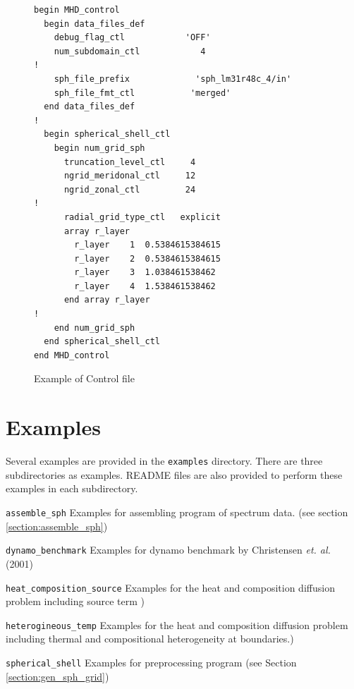 \begin{figure}[htbp]
\begin{center}
%
\begin{verbatim}
begin MHD_control
  begin data_files_def
    debug_flag_ctl            'OFF'
    num_subdomain_ctl            4
!
    sph_file_prefix             'sph_lm31r48c_4/in'
    sph_file_fmt_ctl           'merged'
  end data_files_def
!
  begin spherical_shell_ctl
    begin num_grid_sph
      truncation_level_ctl     4
      ngrid_meridonal_ctl     12
      ngrid_zonal_ctl         24
!
      radial_grid_type_ctl   explicit
      array r_layer
        r_layer    1  0.5384615384615
        r_layer    2  0.5384615384615
        r_layer    3  1.038461538462
        r_layer    4  1.538461538462
      end array r_layer
!
    end num_grid_sph
  end spherical_shell_ctl
end MHD_control
\end{verbatim}
%
\caption{Example of Control file}
\label{fig:control_example}
\end{center}
\end{figure}
%

\newpage
\section{Examples} \label{section:examples}
Several examples are provided in the \verb|examples| directory. There are three subdirectories as examples. README files are also provided to perform these examples in each subdirectory.
%
\begin{description}
\item{\tt assemble\_sph}    Examples for assembling program of spectrum data. (see section \ref{section:assemble_sph})
\item{\tt dynamo\_benchmark} Examples for dynamo benchmark by Christensen {\it et. al.} (2001)
\item{\tt heat\_composition\_source} Examples for the heat and composition diffusion problem including source term )
\item{\tt heterogineous\_temp} Examples for the heat and composition diffusion problem including thermal and compositional heterogeneity at boundaries.)
\item{\tt spherical\_shell} Examples for preprocessing program (see Section \ref{section:gen_sph_grid})
\end{description}
%

